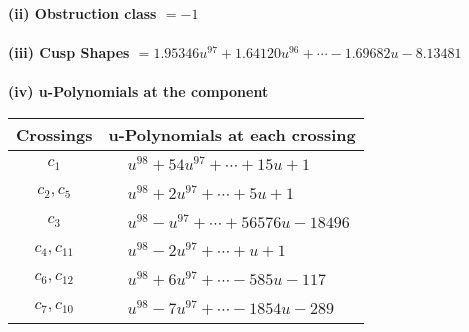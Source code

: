 \documentclass[1p]{elsarticle_modified}
\theoremstyle{definition}
\begin{document}
\flushleft \textbf{(ii) Obstruction class $= -1$}\\~\\
\flushleft \textbf{(iii) Cusp Shapes $= 1.95346 u^{97}+1.64120 u^{96}+\cdots-1.69682 u-8.13481$}\\~\\
\newpage\renewcommand{\arraystretch}{1}
\flushleft \textbf{(iv) u-Polynomials at the component}\newline \\
\begin{tabular}{m{50pt}|m{274pt}}
Crossings & \hspace{64pt}u-Polynomials at each crossing \\
\hline $$\begin{aligned}c_{1}\end{aligned}$$&$\begin{aligned}
&u^{98}+54 u^{97}+\cdots+15 u+1
\end{aligned}$\\
\hline $$\begin{aligned}c_{2},c_{5}\end{aligned}$$&$\begin{aligned}
&u^{98}+2 u^{97}+\cdots+5 u+1
\end{aligned}$\\
\hline $$\begin{aligned}c_{3}\end{aligned}$$&$\begin{aligned}
&u^{98}- u^{97}+\cdots+56576 u-18496
\end{aligned}$\\
\hline $$\begin{aligned}c_{4},c_{11}\end{aligned}$$&$\begin{aligned}
&u^{98}-2 u^{97}+\cdots+u+1
\end{aligned}$\\
\hline $$\begin{aligned}c_{6},c_{12}\end{aligned}$$&$\begin{aligned}
&u^{98}+6 u^{97}+\cdots-585 u-117
\end{aligned}$\\
\hline $$\begin{aligned}c_{7},c_{10}\end{aligned}$$&$\begin{aligned}
&u^{98}-7 u^{97}+\cdots-1854 u-289
\end{aligned}$\\

\end{tabular}
\end{document}
